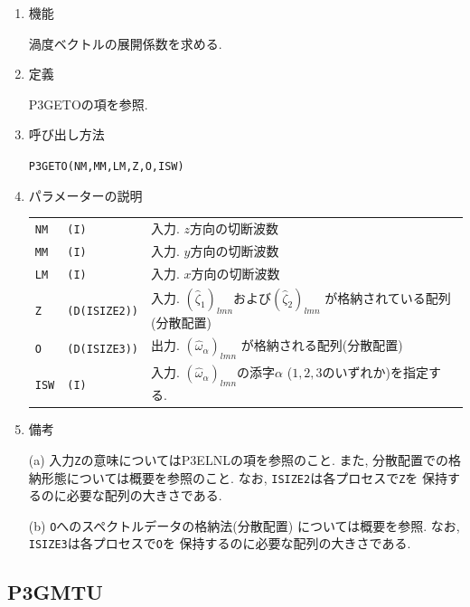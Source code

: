 \documentclass[a4j,fleqn]{jarticle}
\begin{document}
\begin{enumerate}

\item 機能

渦度ベクトルの展開係数を求める.

\item 定義

P3GETOの項を参照.

\item 呼び出し方法

{\tt P3GETO(NM,MM,LM,Z,O,ISW)}
  
\item パラメーターの説明

\begin{tabular}{lll}
{\tt NM} & {\tt (I)} & 入力. $z$方向の切断波数\\
{\tt MM} & {\tt (I)} & 入力. $y$方向の切断波数\\
{\tt LM} & {\tt (I)} & 入力. $x$方向の切断波数\\
{\tt Z} & {\tt (D(ISIZE2))} &
 入力. $(\hat{\zeta}_1)_{lmn}$および$(\hat{\zeta}_2)_{lmn}$
  が格納されている配列(分散配置)\\
{\tt O} & {\tt (D(ISIZE3))} &
 出力. $(\hat{\omega}_{\alpha})_{lmn}$
  が格納される配列(分散配置)\\
{\tt ISW} & {\tt (I)} & 入力. $(\hat{\omega}_{\alpha})_{lmn}$の添字$\alpha$
($1,2,3$のいずれか)を指定する.
\end{tabular}

\item 備考

(a) 入力{\tt Z}の意味についてはP3ELNLの項を参照のこと.
    また, 分散配置での格納形態については概要を参照のこと.
    なお, {\tt ISIZE2}は各プロセスで{\tt Z}を
    保持するのに必要な配列の大きさである.

(b) {\tt O}へのスペクトルデータの格納法(分散配置)
     については概要を参照.
    なお, {\tt ISIZE3}は各プロセスで{\tt O}を
    保持するのに必要な配列の大きさである.


\end{enumerate}


\subsection{P3GMTU}
\end{document}
